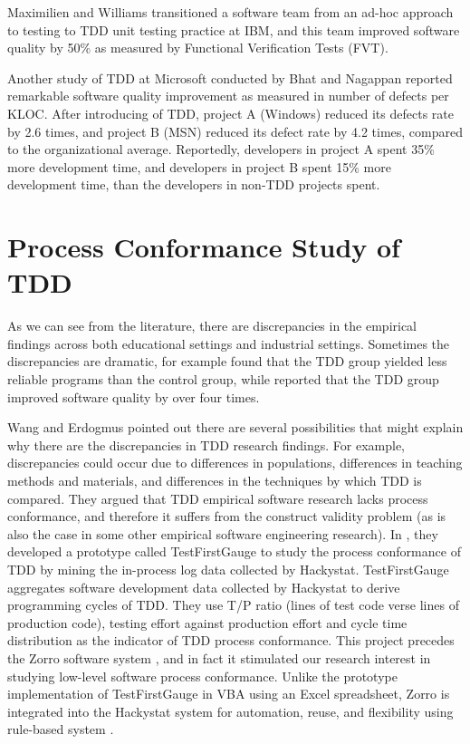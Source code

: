 Maximilien and Williams \cite{Maximilien:03} transitioned a software team
from an ad-hoc approach to testing to TDD unit testing practice at IBM, and
this team improved software quality by 50\% as measured by Functional
Verification Tests (FVT).

Another study of TDD at Microsoft conducted by Bhat and Nagappan
\cite{Bhat:06} reported remarkable software quality improvement as measured
in number of defects per KLOC. After introducing of TDD, project A
(Windows) reduced its defects rate by 2.6 times, and project B (MSN)
reduced its defect rate by 4.2 times, compared to the organizational
average. Reportedly, developers in project A spent 35\% more development
time, and developers in project B spent 15\% more development time, than
the developers in non-TDD projects spent.

\section{Process Conformance Study of TDD}
As we can see from the literature, there are discrepancies in the empirical
findings across both educational settings and industrial settings. Sometimes the
discrepancies are dramatic, for example \cite{Muller:02} found that the TDD
group yielded less reliable programs than the control group, while
\cite{Bhat:06} reported that the TDD group improved software quality by 
over four times.

Wang and Erdogmus \cite{Wang:04} pointed out there are several
possibilities that might explain why there are the discrepancies in TDD
research findings. For example, discrepancies could occur due to
differences in populations, differences in teaching methods and materials,
and differences in the techniques by which TDD is compared. They argued
that TDD empirical software research lacks process conformance, and
therefore it suffers from the construct validity problem (as is also the
case in some other empirical software engineering research). In
\cite{Wang:04}, they developed a prototype called TestFirstGauge to study
the process conformance of TDD by mining the in-process log data collected
by Hackystat. TestFirstGauge aggregates software development data collected
by Hackystat to derive programming cycles of TDD. They use T/P ratio (lines
of test code verse lines of production code), testing effort against
production effort and cycle time distribution as the indicator of TDD
process conformance. This project precedes the Zorro software system
\cite{csdl2-06-02}, and in fact it stimulated our research interest in
studying low-level software process conformance. Unlike the
prototype implementation of TestFirstGauge in VBA using an Excel
spreadsheet, Zorro is integrated into the Hackystat system for automation,
reuse, and flexibility using rule-based system \cite{Friedman-Hill:03}.

